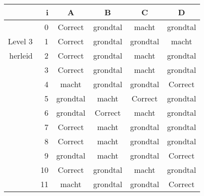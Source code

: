 \begin{tabular}{ rr| c|c|c|c}\hline\hline
     & i & \textbf{A} & \textbf{B} & \textbf{C} & \textbf{D}\\\hline

&0&Correct\cellcolor[gray]{0.6}&grondtal&macht&grondtal\\
Level 3 & 1&Correct\cellcolor[gray]{0.6}&grondtal&grondtal&macht\\
herleid &2&Correct\cellcolor[gray]{0.6}&grondtal&macht&grondtal\\
&3&Correct\cellcolor[gray]{0.6}&grondtal&macht&grondtal\\
&4&macht&grondtal&grondtal&Correct\cellcolor[gray]{0.6}\\
&5&grondtal&macht&Correct\cellcolor[gray]{0.6}&grondtal\\
&6&grondtal&Correct\cellcolor[gray]{0.6}&macht&grondtal\\
&7&Correct\cellcolor[gray]{0.6}&macht&grondtal&grondtal\\
&8&Correct\cellcolor[gray]{0.6}&macht&grondtal&grondtal\\
&9&grondtal&macht&grondtal&Correct\cellcolor[gray]{0.6}\\
&10&Correct\cellcolor[gray]{0.6}&grondtal&macht&grondtal\\
&11&macht&grondtal&grondtal&Correct\cellcolor[gray]{0.6}\\
\hline\end{tabular}\par\ \newline

